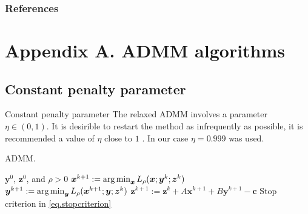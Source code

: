 \documentclass[8pt,red]{beamer}
\theoremstyle{plain}
\theoremstyle{definition}
\theoremstyle{remark}
\newcommand{\argmin}{\operatornamewithlimits{\mathrm{arg\,min}}}
\newcommand{\bi}[1]{\ensuremath{\boldsymbol{#1}}}
\begin{document}
\begin{frame}[allowframebreaks]
\frametitle{References}


\end{frame}

\section*{Appendix A. ADMM algorithms}

\subsection{Constant penalty parameter}
\begin{frame}{Constant penalty parameter}
The relaxed ADMM involves a parameter $\eta \in (0,1)$. It is desirible to restart the method as infrequently as possible, it is recommended a value of $\eta$ close to $1$ \citep{goldstein2014fast}. In our case $\eta = 0.999$ was used.

\begin{algorithm}[H]
  \scriptsize
  \caption{ADMM.}
  \label{alg:prototype.cp-N}
  \begin{algorithmic}[1]
    \Require
    $\bi{y}^{0}$, $\bi{z}^{0}$, and $\rho > 0$ 
    \State
    $\bi{x}^{k+1} 
    := \argmin_{\bi{x}} L_{\rho}(\bi{x};\bi{y}^{k};{\bi{z}}^{k})$ 
    \State
    $\bi{y}^{k+1} 
    := \argmin_{\bi{y}} L_{\rho}(\bi{x}^{k+1};\bi{y};{\bi{z}}^{k})$ 
    \State
    $\bi{z}^{k+1} 
  := \bi{z}^{k} + A \bi{x}^{k+1} + B \bi{y}^{k+1} - \bi{c}$ 
    \State
    Stop criterion in \eqref{eq.stopcriterion}
    \EndFor
  \end{algorithmic}
\end{algorithm}
\end{frame}
\end{document}
